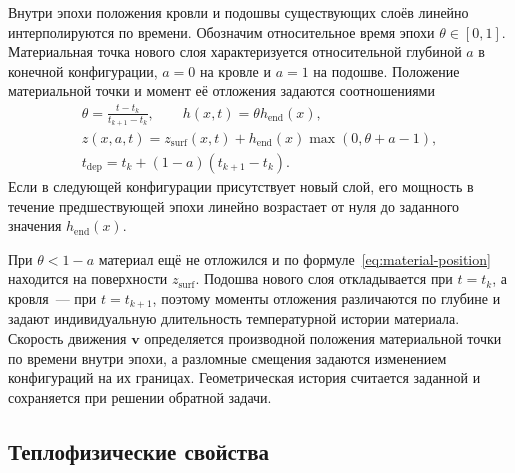 Внутри эпохи положения кровли и подошвы существующих слоёв линейно интерполируются по времени. Обозначим относительное время эпохи $\theta \in [0, 1]$. Материальная точка нового слоя характеризуется относительной глубиной $a$ в конечной конфигурации, $a=0$ на кровле и $a=1$ на подошве. Положение материальной точки и момент её отложения задаются соотношениями
\begin{gather}
 \theta = \frac{t - t_k}{t_{k+1} - t_k},\qquad
 h(x,t) = \theta h_{\mathrm{end}}(x),\\
 z(x,a,t) = z_{\mathrm{surf}}(x,t) + h_{\mathrm{end}}(x)\max(0,\theta + a - 1),\label{eq:material-position}\\
 t_{\mathrm{dep}} = t_k + (1 - a)(t_{k+1} - t_k).
 \label{eq:deposition}
\end{gather}
Если в следующей конфигурации присутствует новый слой, его мощность в течение предшествующей эпохи линейно возрастает от нуля до заданного значения $h_{\mathrm{end}}(x)$.

При $\theta < 1-a$ материал ещё не отложился и по формуле~\eqref{eq:material-position} находится на поверхности $z_{\mathrm{surf}}$. Подошва нового слоя откладывается при $t=t_k$, а кровля~--- при $t=t_{k+1}$, поэтому моменты отложения различаются по глубине и задают индивидуальную длительность температурной истории материала. Скорость движения $\boldsymbol v$ определяется производной положения материальной точки по времени внутри эпохи, а разломные смещения задаются изменением конфигураций на их границах. Геометрическая история считается заданной и сохраняется при решении обратной задачи.

\subsection{Теплофизические свойства}

